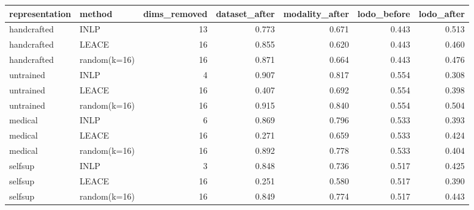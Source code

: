\begin{tabular}{llrrrrr}
\toprule
representation & method & dims\_removed & dataset\_after & modality\_after & lodo\_before & lodo\_after \\
\midrule
handcrafted & INLP & 13 & 0.773 & 0.671 & 0.443 & 0.513 \\
handcrafted & LEACE & 16 & 0.855 & 0.620 & 0.443 & 0.460 \\
handcrafted & random(k=16) & 16 & 0.871 & 0.664 & 0.443 & 0.476 \\
untrained & INLP & 4 & 0.907 & 0.817 & 0.554 & 0.308 \\
untrained & LEACE & 16 & 0.407 & 0.692 & 0.554 & 0.398 \\
untrained & random(k=16) & 16 & 0.915 & 0.840 & 0.554 & 0.504 \\
medical & INLP & 6 & 0.869 & 0.796 & 0.533 & 0.393 \\
medical & LEACE & 16 & 0.271 & 0.659 & 0.533 & 0.424 \\
medical & random(k=16) & 16 & 0.892 & 0.778 & 0.533 & 0.404 \\
selfsup & INLP & 3 & 0.848 & 0.736 & 0.517 & 0.425 \\
selfsup & LEACE & 16 & 0.251 & 0.580 & 0.517 & 0.390 \\
selfsup & random(k=16) & 16 & 0.849 & 0.774 & 0.517 & 0.443 \\
\bottomrule
\end{tabular}
